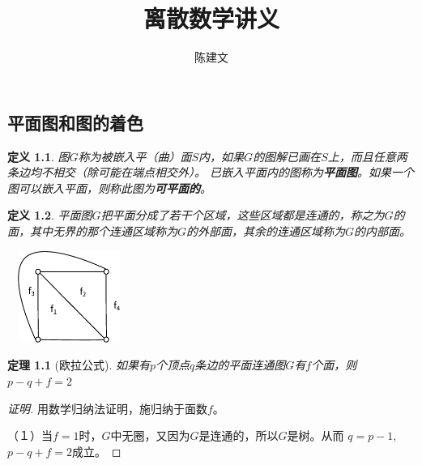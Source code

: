 \documentclass{book}[oneside]
\newtheorem{Def}{定义}[chapter]
\newtheorem{Thm}{定理}[chapter]
\begin{document}
\begin{CJK*}{UTF8}{gbsn}
  \title{离散数学讲义}
  \author{陈建文}
  \maketitle
  

  \setcounter{chapter}{8}
  \chapter{平面图和图的着色}
  \begin{Def}
    图$G$称为被嵌入平（曲）面$S$内，如果$G$的图解已画在$S$上，而且任意两条边均不相交（除可能在端点相交外）。
已嵌入平面内的图称为{\bfseries 平面图}。如果一个图可以嵌入平面，则称此图为{\bfseries 可平面的}。
\end{Def}
  \begin{Def}
    平面图$G$把平面分成了若干个区域，这些区域都是连通的，称之为$G$的面，其中无界的那个连通区域称为$G$的外部面，其余的连通区域称为$G$的内部面。
  \end{Def}
  \begin{center}
  \includegraphics[width=4cm,height=3cm]{face}
\end{center}
\begin{Thm}[欧拉公式]
    如果有$p$个顶点$q$条边的平面连通图$G$有$f$个面，则
      $p - q + f = 2$
    \end{Thm}
    \begin{proof}[证明]
\mbox{}\par{}
    用数学归纳法证明，施归纳于面数$f$。

  （１）当$f=1$时，$G$中无圈，又因为$G$是连通的，所以$G$是树。从而
  $q=p-1$,$p-q+f=2$成立。


\end{proof}
\end{CJK*}
\end{document}

